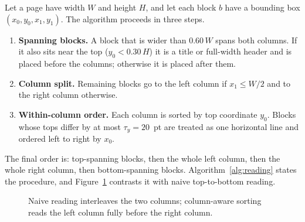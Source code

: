 \documentclass[12pt,a4paper,twoside,openright]{report}
\begin{document}
Let a page have width $W$ and height $H$, and let each block $b$ have a bounding box
$(x_0,y_0,x_1,y_1)$. The algorithm proceeds in three steps.
\begin{enumerate}
  \item \textbf{Spanning blocks.} A block that is wider than $0.60\,W$ spans both
  columns. If it also sits near the top ($y_0 < 0.30\,H$) it is a title or full-width
  header and is placed before the columns; otherwise it is placed after them.
  \item \textbf{Column split.} Remaining blocks go to the left column if $x_1 \le W/2$
  and to the right column otherwise.
  \item \textbf{Within-column order.} Each column is sorted by top coordinate $y_0$.
  Blocks whose tops differ by at most $\tau_y = 20$~pt are treated as one horizontal
  line and ordered left to right by $x_0$.
\end{enumerate}
The final order is: top-spanning blocks, then the whole left column, then the whole
right column, then bottom-spanning blocks. Algorithm~\ref{alg:reading} states the
procedure, and Figure~\ref{fig:reading} contrasts it with naive top-to-bottom reading.

\begin{figure}[!htbp]
\centering
{}
\caption{Naive reading interleaves the two columns; column-aware sorting reads the left
column fully before the right column.}
\label{fig:reading}
\end{figure}
\end{document}
